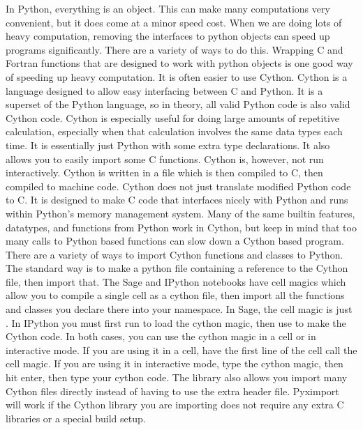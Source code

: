 

In Python, everything is an object.
This can make many computations very convenient, but it does come at a minor speed cost.
When we are doing lots of heavy computation, removing the interfaces to python objects can speed up programs significantly.
There are a variety of ways to do this.
Wrapping C and Fortran functions that are designed to work with python objects is one good way of speeding up heavy computation.
It is often easier to use Cython.
Cython is a language designed to allow easy interfacing between C and Python.
It is a superset of the Python language, so in theory, all valid Python code is also valid Cython code.
Cython is especially useful for doing large amounts of repetitive calculation, especially when that calculation involves the same data types each time.
It is essentially just Python with some extra type declarations.
It also allows you to easily import some C functions.
Cython is, however, not run interactively.
Cython is written in a  file which is then compiled to C, then compiled to machine code.
Cython does not just translate modified Python code to C.
It is designed to make C code that interfaces nicely with Python and runs within Python's memory management system.
Many of the same builtin features, datatypes, and functions from Python work in Cython, but keep in mind that too many calls to Python based functions can slow down a Cython based program.
There are a variety of ways to import Cython functions and classes to Python.
The standard way is to make a python file containing a reference to the Cython file, then import that.
The Sage and IPython notebooks have cell magics which allow you to compile a single cell as a cython file, then import all the functions and classes you declare there into your namespace.
In Sage, the cell magic is just .
In IPython you must first run  to load the cython magic, then use  to make the Cython code.
In both cases, you can use the cython magic in a cell or in interactive mode.
If you are using it in a cell, have the first line of the cell call the cell magic.
If you are using it in interactive mode, type the cython magic, then hit enter, then type your cython code.
The library  also allows you import many Cython files directly instead of having to use the extra header file.
Pyximport will work if the Cython library you are importing does not require any extra C libraries or a special build setup.

